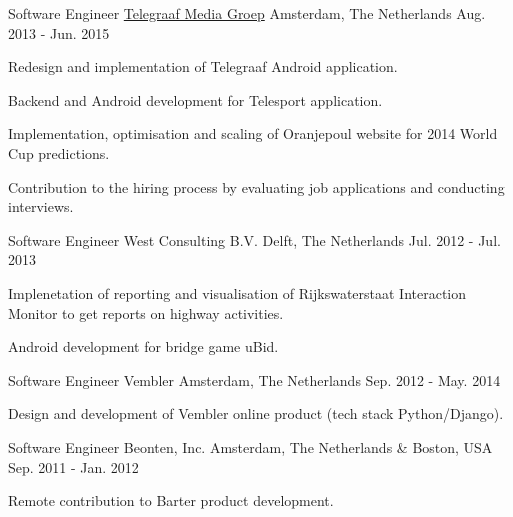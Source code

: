 \begin{cventries}
  \cventry
    {Software Engineer} %
    {\href{https://www.tmg.nl/nl}{Telegraaf Media Groep}} %
    {Amsterdam, The Netherlands} %
    {Aug. 2013 - Jun. 2015} %
    {
      \begin{cvitems} %
        \item {Redesign and implementation of Telegraaf Android application.}
        \item {Backend and Android development for Telesport application.}
        \item {Implementation, optimisation and scaling of Oranjepoul website for 2014 World Cup predictions.}
        \item {Contribution to the hiring process by evaluating job applications and conducting interviews.}
      \end{cvitems}
    }

  \cventry
    {Software Engineer} %
    {West Consulting B.V.} %
    {Delft, The Netherlands} %
    {Jul. 2012 - Jul. 2013} %
    {
      \begin{cvitems} %
        \item {Implenetation of reporting and visualisation of Rijkswaterstaat Interaction Monitor to get reports on highway activities.}
        \item {Android development for bridge game uBid.}
      \end{cvitems}
    }

  \cventry
    {Software Engineer} %
    {Vembler} %
    {Amsterdam, The Netherlands} %
    {Sep. 2012 - May. 2014} %
    {
      \begin{cvitems} %
        \item {Design and development of Vembler online product (tech stack Python/Django).}
      \end{cvitems}
    }

  \cventry
    {Software Engineer} %
    {Beonten, Inc.} %
    {Amsterdam, The Netherlands \& Boston, USA} %
    {Sep. 2011 - Jan. 2012} %
    {
      \begin{cvitems} %
        \item {Remote contribution to Barter product development.}
      \end{cvitems}
    }

\end{cventries}
